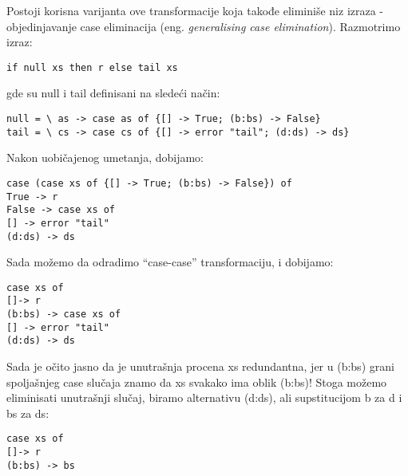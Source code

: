 Postoji korisna varijanta ove transformacije koja takođe eliminiše niz izraza - objedinjavanje case eliminacija (eng. \emph{generalising case elimination}). Razmotrimo izraz:
\begin{verbatim}
if null xs then r else tail xs
\end{verbatim}
gde su null i tail definisani na sledeći način:
\begin{verbatim}
null = \ as -> case as of {[] -> True; (b:bs) -> False}
tail = \ cs -> case cs of {[] -> error "tail"; (d:ds) -> ds}
\end{verbatim}
Nakon uobičajenog umetanja, dobijamo:
\begin{verbatim}
case (case xs of {[] -> True; (b:bs) -> False}) of
True -> r
False -> case xs of
[] -> error "tail"
(d:ds) -> ds
\end{verbatim}
Sada možemo da odradimo “case-case” transformaciju, i dobijamo:
\begin{verbatim}
case xs of
[]-> r
(b:bs) -> case xs of
[] -> error "tail"
(d:ds) -> ds
\end{verbatim}
Sada je očito jasno da je unutrašnja procena xs redundantna, jer u (b:bs) grani spoljašnjeg case slučaja znamo da xs svakako ima 
oblik (b:bs)! Stoga možemo eliminisati unutrašnji slučaj, biramo alternativu (d:ds), ali supstitucijom b za d i bs za ds: 
\begin{verbatim}
case xs of
[]-> r
(b:bs) -> bs
\end{verbatim}
